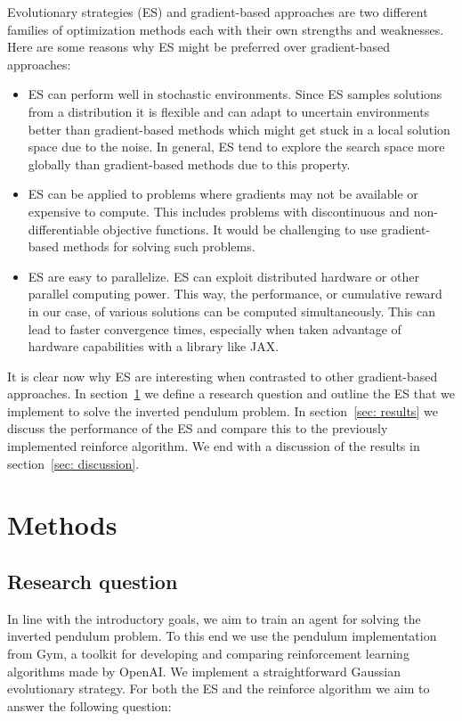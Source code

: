 \documentclass{article}
\begin{document}
Evolutionary strategies (ES) and gradient-based approaches are two different
families of optimization methods each with their own strengths and weaknesses.
Here are some reasons why ES might be preferred over gradient-based approaches:

\begin{itemize}
	\item
		ES can perform well in stochastic environments. Since ES samples
		solutions from a distribution it is flexible and can adapt to uncertain
		environments better than gradient-based methods which might get stuck
		in a local solution space due to the noise. In general, ES tend to
		explore the search space more globally than gradient-based methods due
		to this property.
	\item
		ES can be applied to problems where gradients may not be available or
		expensive to compute. This includes problems with discontinuous and
		non-differentiable objective functions. It would be challenging to use
		gradient-based methods for solving such problems.
	\item
		ES are easy to parallelize. ES can exploit distributed hardware or
		other parallel computing power. This way, the performance, or cumulative
		reward in our case, of various solutions can be computed
		simultaneously. This can lead to faster convergence times, especially
		when taken advantage of hardware capabilities with a library like JAX.
\end{itemize}

It is clear now why ES are interesting when contrasted to other gradient-based
approaches. In section~\ref{sec: methods} we define a research question and
outline the ES that we implement to solve the inverted pendulum problem. In
section~\ref{sec: results} we discuss the performance of the ES and compare
this to the previously implemented reinforce algorithm. We end with a
discussion of the results in section~\ref{sec: discussion}.

\section{Methods}
\label{sec: methods}

\subsection{Research question}
\label{sec: research question}
In line with the introductory goals, we aim to train an agent for solving the
inverted pendulum problem. To this end we use the pendulum implementation from
Gym, a toolkit for developing and comparing reinforcement learning algorithms
made by OpenAI. We implement a straightforward Gaussian evolutionary strategy.
For both the ES and the reinforce algorithm we aim to answer the following
question:
\end{document}
